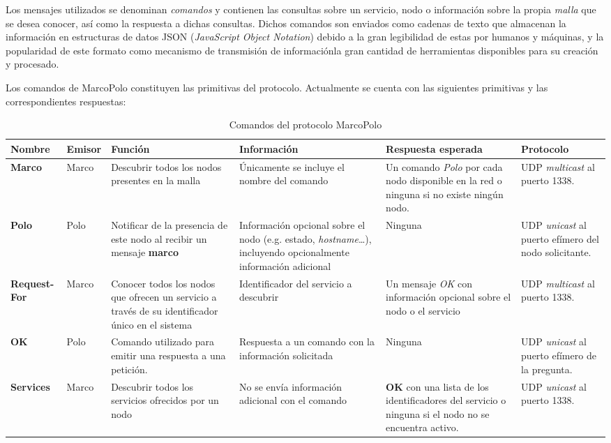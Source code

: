 Los mensajes utilizados se denominan \textit{comandos} y contienen las consultas sobre un servicio, nodo o información sobre la propia \textit{malla} que se desea conocer, así como la respuesta a dichas consultas. Dichos comandos son enviados como cadenas de texto que almacenan la información en estructuras de datos JSON (\textit{JavaScript Object Notation}) debido a la gran legibilidad de estas por humanos y máquinas, y la popularidad de este formato como mecanismo de transmisión de informaciónla gran cantidad de herramientas disponibles para su creación y procesado.

Los comandos de MarcoPolo constituyen las primitivas del protocolo. Actualmente se cuenta con las siguientes primitivas y las correspondientes respuestas:
\begin{landscape}
\begin{table}[H]
\begin{tabular}{|p{2.35cm}|p{1.2cm}|p{4.5cm}|p{5cm}|p{5cm}|p{3.5cm}|}
\hline
\textbf{Nombre} & \textbf{Emisor} & \textbf{Función} & \textbf{Información} & \textbf{Respuesta esperada} & \textbf{Protocolo}\\ \hline

\textbf{Marco} & Marco & Descubrir todos los nodos presentes en la malla & Únicamente se incluye el nombre del comando & Un comando \textit{Polo} por cada nodo disponible en la red o ninguna si no existe ningún nodo. & UDP \textit{multicast} al puerto 1338.\\ \hline

\textbf{Polo} & Polo & Notificar de la presencia de este nodo al recibir un mensaje \textbf{marco} & Información opcional sobre el nodo (e.g. estado, \textit{hostname}\dots), incluyendo opcionalmente información adicional  & Ninguna &  UDP \textit{unicast} al puerto efímero del nodo solicitante.\\ \hline

\textbf{Request-For} & Marco & Conocer todos los nodos que ofrecen un servicio a través de su identificador único en el sistema & Identificador del servicio a descubrir & Un mensaje \textit{OK} con información opcional sobre el nodo o el servicio & UDP \textit{multicast} al puerto 1338.\\ \hline

\textbf{OK} & Polo & Comando utilizado para emitir una respuesta a una petición. & Respuesta a un comando con la información solicitada & Ninguna & UDP \textit{unicast} al puerto efímero de la pregunta.\\ \hline

\textbf{Services} & Marco & Descubrir todos los servicios ofrecidos por un nodo & No se envía información adicional con el comando & \textbf{OK} con una lista de los identificadores del servicio o ninguna si el nodo no se encuentra activo. & UDP \textit{unicast} al puerto 1338.\\ \hline
\end{tabular}
\caption{Comandos del protocolo MarcoPolo}
\end{table}
\end{landscape}

